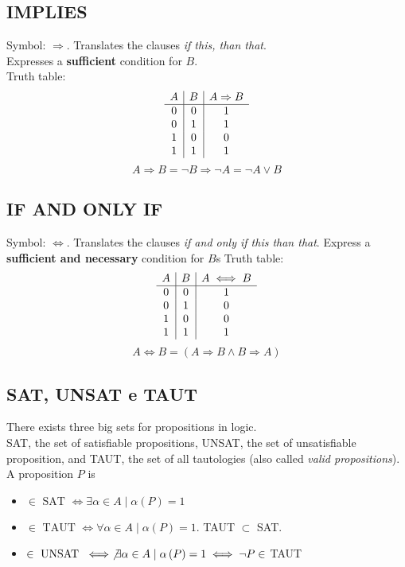 \documentclass{report}
\newcommand{\implies}{\Rightarrow}
\begin{document}
        \subsection{IMPLIES}
            Symbol: $\implies$. Translates the clauses \textit{if this, than that}. \\
            Expresses a \textbf{sufficient} condition for $B$. \\
            Truth table:
            $$\begin{array}{c | c | c}
                A & B & A \implies B \\
                \hline
                0 & 0 & 1 \\
                0 & 1 & 1 \\
                1 & 0 & 0 \\
                1 & 1 & 1 \\
            \end{array}$$
            $$A \implies B = \neg B \implies \neg A = \neg A \lor B$$ 
        \subsection{IF AND ONLY IF}
            Symbol: $\iff$. Translates the clauses \textit{if and only if this than that}.
            Express a \textbf{sufficient and necessary} condition for $B$s
            Truth table:
            $$\begin{array}{c | c | c}
                A & B & A \iff B \\
                \hline
                0 & 0 & 1 \\
                0 & 1 & 0 \\
                1 & 0 & 0 \\
                1 & 1 & 1 \\
            \end{array}$$
            $$A \iff B = \left(A \implies B \land B \implies A\right)$$
        \subsection{SAT, UNSAT e TAUT}
            There exists three big sets for propositions in logic. \\
            SAT, the set of satisfiable propositions, UNSAT, the set of unsatisfiable proposition, 
            and TAUT, the set of all tautologies (also called \textit{valid propositions}). \\
            A proposition $P$ is
            \begin{itemize}
                \item $\in \textrm{ SAT } \iff \exists \alpha \in A \mid \alpha\left(P\right) = 1$
                \item $\in \textrm{ TAUT } \iff \forall \alpha \in A \mid \alpha\left(P\right) = 1$. TAUT $\subset $ SAT.
                \item $\in \textrm{ UNSAT } \iff \not\exists \alpha \in A \mid \alpha\left(P\right) = 1 \iff \neg P \in$ TAUT
            \end{itemize}
\end{document}
